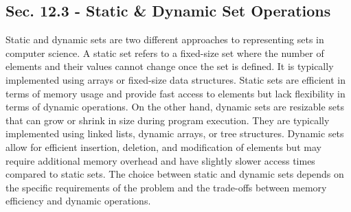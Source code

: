 \subsection*{Sec. 12.3 - Static \& Dynamic Set Operations}

Static and dynamic sets are two different approaches to representing sets in computer science. A static set refers to a fixed-size set where the number of elements and their values cannot change once the set is defined. It is typically implemented using arrays or fixed-size data structures. Static sets are efficient in terms of memory usage and provide fast access to 
elements but lack flexibility in terms of dynamic operations. On the other hand, dynamic sets are resizable sets that can grow or shrink in size during program execution. They are typically implemented using linked lists, dynamic arrays, or tree structures. Dynamic sets allow for efficient insertion, deletion, and modification of elements but may require additional 
memory overhead and have slightly slower access times compared to static sets. The choice between static and dynamic sets depends on the specific requirements of the problem and the trade-offs between memory efficiency and dynamic operations.

